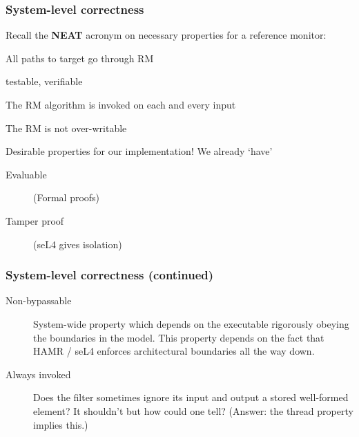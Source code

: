 \documentclass{beamer}
\newcommand{\kemph}[1]{\colorbox{orange}{#1}}
\begin{document}
\begin{frame}\frametitle{System-level correctness}

Recall the \textbf{NEAT} acronym on necessary properties for a reference monitor:

\begin{description}[<+->]
\item [\kemph{Non-bypassable}] All paths to target go through RM
\item [\kemph{Evaluable}] testable, verifiable
\item [\kemph{Always invoked}] The RM algorithm is invoked on each and every input
\item [\kemph{Tamper proof}] The RM is not over-writable
\end{description}

\noindent Desirable properties for our implementation! We already `have'

\begin{description}
   \item [Evaluable] (Formal proofs)
   \item [Tamper proof] (seL4 gives isolation)
\end{description}

\end{frame}

\begin{frame}\frametitle{System-level correctness (continued)}

\begin{description}
   \item [Non-bypassable] System-wide property which depends on the
     executable rigorously obeying the boundaries in the model. This
     property depends on the fact that HAMR / seL4 enforces
     architectural boundaries all the way down.

   \item [Always invoked] Does the filter sometimes ignore its input
     and output a stored well-formed element? It shouldn't but how
     could one tell? (Answer: the thread property implies this.)

\end{description}
\end{frame}
\end{document}
